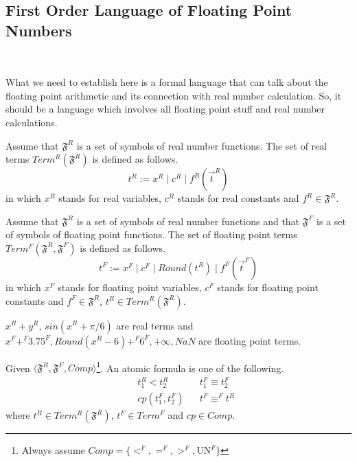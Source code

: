 \documentclass[12pt]{article}
\begin{document}
\subsection{First Order Language of Floating Point Numbers} \

What we need to establish here is a formal language that can talk about the floating point arithmetic and its connection with real number calculation. So, it should be a language which involves all floating point stuff and real number calculations.

\begin{definition}
Assume that $\mathfrak{F}^R$ is a set of symbols of real number functions. The set of real terms $Term^R(\mathfrak{F}^R)$ is defined as follows.
$$ t^R:= x^R \mid c^R \mid f^R(\vec{t}^R) $$
in which $x^R$ stands for real variables, $c^R$ stands for real constants and $f^R \in \mathfrak{F}^R$.
\end{definition}


\begin{definition}
Assume that $\mathfrak{F}^R$ is a set of symbols of real number functions and that $\mathfrak{F}^F$ is a set of symbols of floating point functions. The set of floating point terms $Term^F(\mathfrak{F}^R, \mathfrak{F}^F)$ is defined as follows.
$$ t^F:= x^F \mid c^F \mid Round(t^R) \mid f^F(\vec{t}^F)$$
in which $x^F$ stands for floating point variables, $c^F$ stands for floating point constants and $f^F \in \mathfrak{F}^R$, $t^R \in Term^R(\mathfrak{F}^R)$.
\end{definition}

\begin{example}
$x^R + y^R$, $sin(x^R+\pi/6)$ are real terms and $x^F +^F 3.75^F, Round(x^R - 6) +^F 6^F, +\infty, NaN$ are floating point terms.
\end{example}

\begin{definition}
Given $\langle \mathfrak{F}^R, \mathfrak{F}^F, Comp\rangle$\footnote{Always assume $Comp = \{<^F, =^F, >^F, \text{UN}^F\} $}. An atomic formula is one of the following.
$$
\begin{matrix}
&&t_1^R<t_2^R   &&t_1^F \equiv t_2^F \\
&&cp(t_1^F, t_2^F)  &&t^F \equiv^F t^R
\end{matrix}
$$
where $t^R \in Term^R(\mathfrak{F}^R)$, $t^F \in Term^F$ and $cp \in Comp$.
\end{definition}
\end{document}
